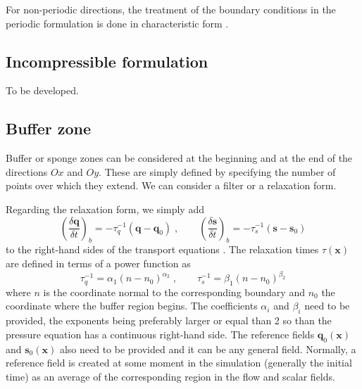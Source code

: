 For non-periodic directions, the treatment of the boundary conditions in the
periodic formulation is done in characteristic form
\citep{Thompson:1987,Thompson:1990,Lodato:2008}.

\subsection{Incompressible formulation}

To be developed.

\subsection{Buffer zone}\label{sec:buffer}

Buffer or sponge zones can be considered at the beginning and at the end of the
directions $Ox$ and $Oy$. These are simply defined by specifying the number of
points over which they extend. We can consider a filter or a relaxation form.

Regarding the relaxation form, we simply add
\begin{equation}
\left(\frac{\delta \mathbf{q}}{\delta t}\right)_b=-\tau_q^{-1}(\mathbf{q}-\mathbf{q}_0)
\;,\qquad
\left(\frac{\delta \mathbf{s}}{\delta t}\right)_b=-\tau_s^{-1}(\mathbf{s}-\mathbf{s}_0)
\end{equation}
to the right-hand sides of the transport equations \citep{Hu:1996b}.  The
relaxation times $\tau(\mathbf{x})$ are defined in terms of a power function as
\begin{equation}
  \tau_q^{-1}=\alpha_1(n-n_0)^{\alpha_2} \;,\qquad
  \tau_s^{-1}=\beta_1(n-n_0)^{\beta_2}
\end{equation}
where $n$ is the coordinate normal to the corresponding boundary and $n_0$ the
coordinate where the buffer region begins. The coefficients $\alpha_i$ and
$\beta_i$ need to be provided, the exponents being preferably larger or equal
than 2 so than the pressure equation has a continuous right-hand side.  The
reference fields $\mathbf{q}_0(\mathbf{x})$ and $\mathbf{s}_0(\mathbf{x})$ also
need to be provided and it can be any general field. Normally, a reference field
is created at some moment in the simulation (generally the initial time) as an
average of the corresponding region in the flow and scalar fields.
